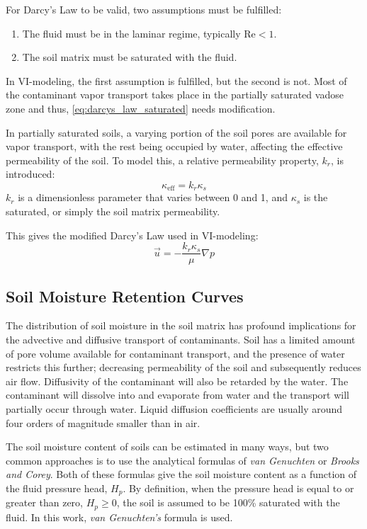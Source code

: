 \documentclass[../thesis.tex]{subfiles}
\begin{document}
For Darcy's Law to be valid, two assumptions must be fulfilled:
\begin{enumerate}
  \item The fluid must be in the laminar regime, typically $\mathrm{Re} < 1$.
  \item The soil matrix must be saturated with the fluid.
\end{enumerate}
In VI-modeling, the first assumption is fulfilled, but the second is not.
Most of the contaminant vapor transport takes place in the partially saturated vadose zone and thus, \eqref{eq:darcys_law_saturated} needs modification.

In partially saturated soils, a varying portion of the soil pores are available for vapor transport, with the rest being occupied by water, affecting the effective permeability of the soil.
To model this, a relative permeability property, $k_r$, is introduced:
\begin{equation}
  \kappa_\mathrm{eff} = k_r \kappa_s
\end{equation}
$k_r$ is a dimensionless parameter that varies between 0 and 1, and $\kappa_s$ is the saturated, or simply the soil matrix permeability.

This gives the modified Darcy's Law used in VI-modeling:
\begin{equation}\label{eq:darcys_law}
  \vec{u} = -\frac{k_r \kappa_s}{\mu}\nabla p
\end{equation}


\subsection{Soil Moisture Retention Curves}

The distribution of soil moisture in the soil matrix has profound implications for the advective and diffusive transport of contaminants.
Soil has a limited amount of pore volume available for contaminant transport, and the presence of water restricts this further; decreasing permeability of the soil and subsequently reduces air flow.
Diffusivity of the contaminant will also be retarded by the water.
The contaminant will dissolve into and evaporate from water and the transport will partially occur through water.
Liquid diffusion coefficients are usually around four orders of magnitude smaller than in air.

The soil moisture content of soils can be estimated in many ways, but two common approaches is to use the analytical formulas of \textit{van Genuchten} or \textit{Brooks and Corey}.
Both of these formulas give the soil moisture content as a function of the fluid pressure head, $H_p$.
By definition, when the pressure head is equal to or greater than zero, $H_p \geq 0$, the soil is assumed to be 100\% saturated with the fluid.
In this work, \textit{van Genuchten's} formula is used.
\end{document}
